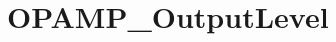 \hypertarget{group___o_p_a_m_p___output_level}{\section{O\-P\-A\-M\-P\-\_\-\-Output\-Level}
\label{group___o_p_a_m_p___output_level}
}
